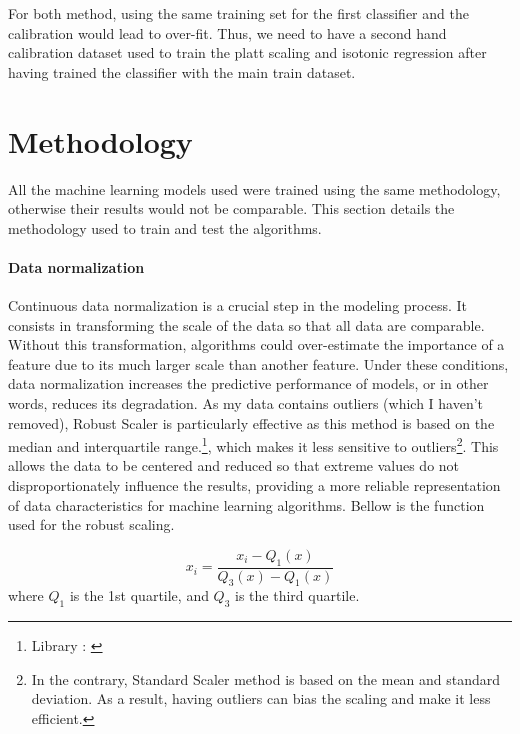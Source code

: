 \documentclass[12pt]{article}
\begin{document}
 

 For both method, using the same training set for the first classifier and the calibration would lead to over-fit. Thus, we need to have a second hand calibration dataset used to train the platt scaling and isotonic regression after having trained the classifier with the main train dataset. 






\newpage
\section{Methodology}
All the machine learning models used were trained using the same methodology, otherwise their results would not be comparable.
This section details the methodology used to train and test the algorithms.

\paragraph{Data normalization} Continuous data normalization is a crucial step in the modeling process. It consists in transforming the scale of the data so that all data are comparable. Without this transformation, algorithms could over-estimate the importance of a feature due to its much larger scale than another feature. Under these conditions, data normalization increases the predictive performance of models, or in other words, reduces its degradation.
As my data contains outliers (which I haven't removed), Robust Scaler is particularly effective as this method is based on the median and interquartile range.\footnote{Library : \cite{RobustScaler}}, which makes it less sensitive to outliers\footnote{In the contrary, Standard Scaler method is based on the mean and standard deviation.  As a result, having outliers can bias the scaling and make it less efficient.}. 
This allows the data to be centered and reduced so that extreme values do not disproportionately influence the results, providing a more reliable representation of data characteristics for machine learning algorithms. Bellow is the function used for the robust scaling.

\begin{equation}
x_i = \frac{x_i - Q_1(x)}{Q_3(x) - Q_1(x)}    
\end{equation}
where $Q_1$ is the 1st quartile, and $Q_3$ is the third quartile.
\end{document}
